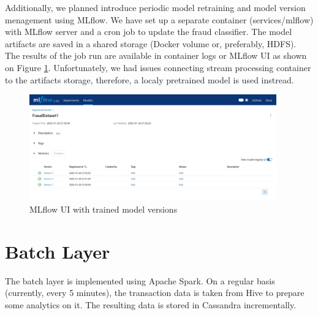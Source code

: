 \documentclass[12pt,a4paper, hidelinks]{article}
\begin{document}
Additionally, we planned introduce periodic model retraining and model version menagement using MLflow. We have set up a separate container (services/mlflow) with MLflow server and a cron job to update the fraud classifier. The model artifacts are saved in a shared storage (Docker volume or, preferably, HDFS). The results of the job run are available in container logs or MLflow UI as shown on Figure \ref{fig:mlflowUi}. Unfortunately, we had issues connecting stream processing container to the artifacts storage, therefore, a localy pretrained model is used instread.

\begin{figure}[H]
    \centering
    \includegraphics[width=0.95\textwidth]{images/mlflowUi.png}
    \caption{MLflow UI with trained model versions}
    \label{fig:mlflowUi}
\end{figure}

\section{Batch Layer}

The batch layer is implemented using Apache Spark. On a regular basis (currently, every 5 minutes), the transaction data is taken from Hive to prepare some analytics on it. The resulting data is stored in Cassandra incrementally.
\end{document}
